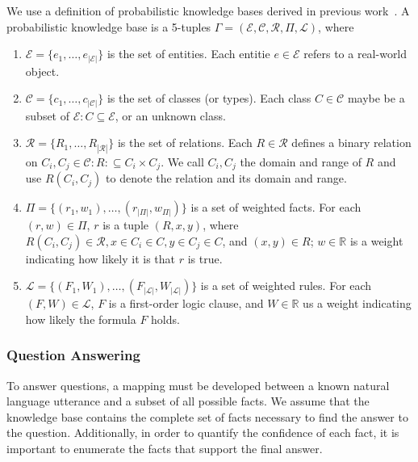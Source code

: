 We use a definition of probabilistic knowledge bases derived in previous work~\cite{chen2014knowledge}.
A probabilistic knowledge base is a 5-tuples \(\Gamma = (\mathcal{E}, \mathcal{C}, \mathcal{R}, \Pi, \mathcal{L})\), where
\begin{enumerate}[itemsep=2pt,topsep=3pt,parsep=0pt,partopsep=0pt,
                  leftmargin=0pt,labelindent=0pt,itemindent=12pt]
\item \(\mathcal{E} = \{ e_1, \ldots, e_{|\mathcal{E}|} \} \) is the set of entities.
Each entitie \( e \in \mathcal{E} \) refers to a real-world object.

\item \(\mathcal{C} = \{ c_1, \ldots, c_{|\mathcal{C}|} \} \) is the set of classes (or types).
Each class \( C \in \mathcal{C} \) maybe be a subset of \(\mathcal{E} : C \subseteq \mathcal{E}\), or an unknown class.

\item \(\mathcal{R} = \{ R_1, \ldots, R_{|\mathcal{R}|} \} \) is the set of relations.
Each \(R \in \mathcal{R} \) defines a binary relation on \(C_i, C_j \in \mathcal{C}: R: \subseteq C_i \times C_j\).
We call \(C_i, C_j\) the domain and range of \(R\) and use \(R(C_i,C_j)\) to denote the relation and its domain and range.

\item \(\Pi = \{(r_1, w_1), \ldots, (r_{|\Pi|}, w_{\Pi|})\} \) is a set of weighted facts.
For each \( (r,w) \in \Pi\), \(r\) is a tuple  \((R,x,y)\),
where \(R(C_i,C_j) \in \mathcal{R}, x \in C_i \in C, y \in C_j \in C\), and \((x,y) \in R\);
\(w \in \mathbb{R}\) is a weight indicating how likely it is that \(r\) is true. 

\item \(\mathcal{L} = \{(F_1,W_1),\ldots, (F_{|\mathcal{L}|}, W_{|\mathcal{L}|}) \} \) is a set of weighted rules.
For each \((F, W) \in \mathcal{L} \), \(F\) is a first-order logic clause, and
\(W \in \mathbb{R} \) us a weight indicating how likely the formula \(F\)
holds. 

\end{enumerate}


\subsubsection{Question Answering}

To answer questions, a mapping must be developed between a known
natural language utterance and a subset of all possible facts.
We assume that the knowledge base contains the complete set of facts necessary
to find the answer to the question.
Additionally, in order to quantify the confidence of each fact, it is
important to enumerate the facts that support the final answer.


